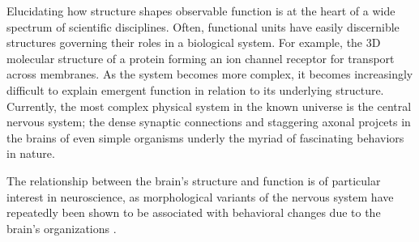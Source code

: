Elucidating how structure shapes observable function is at the heart of a wide spectrum of scientific disciplines. Often, functional units have easily discernible structures governing their roles in a biological system. For example, the 3D molecular structure of a protein forming an ion channel receptor for transport across membranes. As the system becomes more complex, it becomes increasingly difficult to explain emergent function in relation to its underlying structure. Currently, the most complex physical system in the known universe is the central nervous system; the dense synaptic connections and staggering axonal projcets in the brains of even simple organisms underly the myriad of fascinating behaviors in nature.

The relationship between the brain's structure and function is of particular interest in neuroscience, as morphological variants of the nervous system have repeatedly been shown to be associated with behavioral changes due to the brain's organizations \cite{sharp_default_2011,shen_using_2017}.




